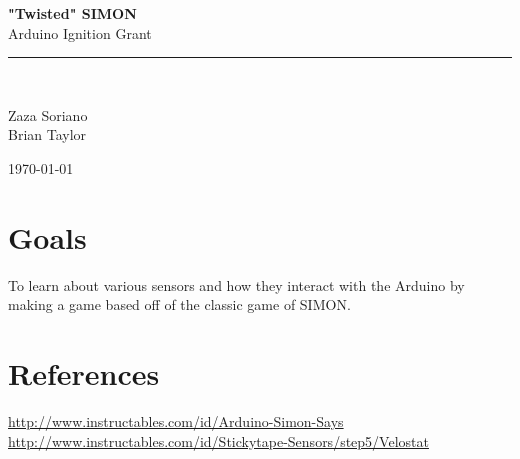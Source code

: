 \documentclass[12pt,letterpaper,oneside]{article}
\newcommand{\HRule}{\rule{\linewidth}{0.5mm}}
\begin{document}
\begin{titlepage}
\vspace*{\fill}
\begin{center}
	
{\huge \bfseries "Twisted" SIMON} \\[0.4cm]
Arduino Ignition Grant
\HRule \\[0.4cm]

\begin{minipage}{\textwidth}
\center
Zaza Soriano\\
Brian Taylor
\end{minipage}

\vspace*{\fill}

{\large \today}
\end{center}
\end{titlepage}

\doublespace
\tableofcontents %
\newpage
\lstlistoflistings %
\newpage
\singlespace
{} %
			
\section{Goals}
To learn about various sensors and how they interact with the Arduino by making a game based off of the classic game of SIMON.

\section{References} \label{sec:ref}
\url{http://www.instructables.com/id/Arduino-Simon-Says}\\
\url{http://www.instructables.com/id/Stickytape-Sensors/step5/Velostat}
\end{document}
